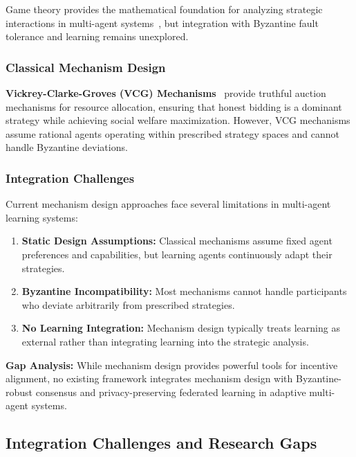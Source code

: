 \documentclass[conference]{IEEEtran}
\begin{document}
Game theory provides the mathematical foundation for analyzing strategic interactions in multi-agent systems~\cite{myerson1991game}, but integration with Byzantine fault tolerance and learning remains unexplored.

\subsubsection{Classical Mechanism Design}

\textbf{Vickrey-Clarke-Groves (VCG) Mechanisms}~\cite{vickrey1961counterspeculation} provide truthful auction mechanisms for resource allocation, ensuring that honest bidding is a dominant strategy while achieving social welfare maximization. However, VCG mechanisms assume rational agents operating within prescribed strategy spaces and cannot handle Byzantine deviations.

\subsubsection{Integration Challenges}

Current mechanism design approaches face several limitations in multi-agent learning systems:

\begin{enumerate}
    \item \textbf{Static Design Assumptions:} Classical mechanisms assume fixed agent preferences and capabilities, but learning agents continuously adapt their strategies.
    
    \item \textbf{Byzantine Incompatibility:} Most mechanisms cannot handle participants who deviate arbitrarily from prescribed strategies.
    
    \item \textbf{No Learning Integration:} Mechanism design typically treats learning as external rather than integrating learning into the strategic analysis.
\end{enumerate}

\textbf{Gap Analysis:} While mechanism design provides powerful tools for incentive alignment, no existing framework integrates mechanism design with Byzantine-robust consensus and privacy-preserving federated learning in adaptive multi-agent systems.

\subsection{Integration Challenges and Research Gaps}
\end{document}
